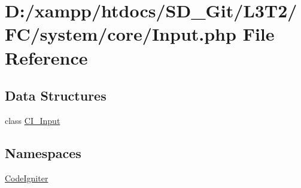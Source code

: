 \hypertarget{system_2core_2_input_8php}{}\section{D\+:/xampp/htdocs/\+S\+D\+\_\+\+Git/\+L3\+T2/\+F\+C/system/core/\+Input.php File Reference}
\label{system_2core_2_input_8php}
\subsection*{Data Structures}
\begin{DoxyCompactItemize}
\item 
class \hyperlink{class_c_i___input}{C\+I\+\_\+\+Input}
\end{DoxyCompactItemize}
\subsection*{Namespaces}
\begin{DoxyCompactItemize}
\item 
 \hyperlink{namespace_code_igniter}{Code\+Igniter}
\end{DoxyCompactItemize}
